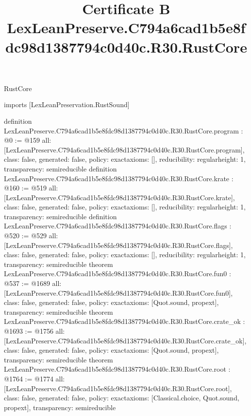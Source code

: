 \begin{lexlean}{RustCore}
\title{Certificate B LexLeanPreserve.C794a6cad1b5e8fdc98d1387794c0d40c.R30.RustCore}
\begin{coremodule}
imports [LexLeanPreservation.RustSound]

definition LexLeanPreserve.C794a6cad1b5e8fdc98d1387794c0d40c.R30.RustCore.program : @0 := @159 {
  all: [LexLeanPreserve.C794a6cad1b5e8fdc98d1387794c0d40c.R30.RustCore.program],
  class: false,
  generated: false,
  policy: exact{axioms: []},
  reducibility: regular{height: 1},
  transparency: semireducible
}
definition LexLeanPreserve.C794a6cad1b5e8fdc98d1387794c0d40c.R30.RustCore.krate : @160 := @519 {
  all: [LexLeanPreserve.C794a6cad1b5e8fdc98d1387794c0d40c.R30.RustCore.krate],
  class: false,
  generated: false,
  policy: exact{axioms: []},
  reducibility: regular{height: 1},
  transparency: semireducible
}
definition LexLeanPreserve.C794a6cad1b5e8fdc98d1387794c0d40c.R30.RustCore.flags : @520 := @529 {
  all: [LexLeanPreserve.C794a6cad1b5e8fdc98d1387794c0d40c.R30.RustCore.flags],
  class: false,
  generated: false,
  policy: exact{axioms: []},
  reducibility: regular{height: 1},
  transparency: semireducible
}
theorem LexLeanPreserve.C794a6cad1b5e8fdc98d1387794c0d40c.R30.RustCore.fun0 : @537 := @1689 {
  all: [LexLeanPreserve.C794a6cad1b5e8fdc98d1387794c0d40c.R30.RustCore.fun0],
  class: false,
  generated: false,
  policy: exact{axioms: [Quot.sound, propext]},
  transparency: semireducible
}
theorem LexLeanPreserve.C794a6cad1b5e8fdc98d1387794c0d40c.R30.RustCore.crate_ok : @1693 := @1756 {
  all: [LexLeanPreserve.C794a6cad1b5e8fdc98d1387794c0d40c.R30.RustCore.crate_ok],
  class: false,
  generated: false,
  policy: exact{axioms: [Quot.sound, propext]},
  transparency: semireducible
}
theorem LexLeanPreserve.C794a6cad1b5e8fdc98d1387794c0d40c.R30.RustCore.root : @1764 := @1774 {
  all: [LexLeanPreserve.C794a6cad1b5e8fdc98d1387794c0d40c.R30.RustCore.root],
  class: false,
  generated: false,
  policy: exact{axioms: [Classical.choice, Quot.sound, propext]},
  transparency: semireducible
}


\end{coremodule}
\end{lexlean}
